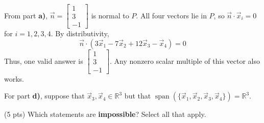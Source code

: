 \documentclass[11pt,twoside]{article}
\begin{document}
\begin{prob}[(19 pts)]
\begin{subprob}
\begin{solution}
From part \textbf{a)}, $\vec n=\begin{bmatrix}1\\3\\-1\end{bmatrix}$ is normal to $P$. All four vectors lie in $P$, so $\vec n\cdot\vec x_i=0$ for $i=1,2,3,4$. By distributivity,
\[
\vec n\cdot(3\vec x_1-7\vec x_2+12\vec x_3-\vec x_4)=0
\]
Thus, one valid answer is $\boxed{\begin{bmatrix}1\\3\\-1\end{bmatrix}}$. Any nonzero scalar multiple of this vector also works.
\end{solution}
\end{subprob}

\newpage
For part \textbf{d)}, suppose that $\vec x_3,\vec x_4\in\mathbb R^3$ but that $\operatorname{span}(\{\vec x_1,\vec x_2,\vec x_3,\vec x_4\}) = \mathbb R^3$.


\begin{subprob}(5 pts) Which statements are \textbf{impossible}? Select all that apply.

\par\medskip
{} \\[0.2em]
 \\[0.2em]
 \\[0.2em]
 \\[0.2em]


\end{subprob}
\end{prob}
\end{document}
